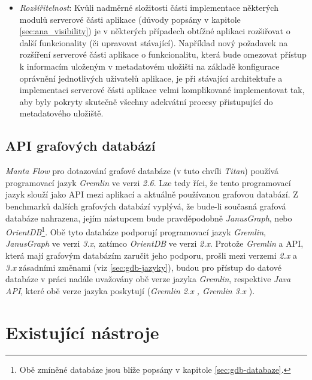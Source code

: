 \begin{itemize}
	\item{\textit{Rozšířitelnost}}: Kvůli nadměrné složitosti části implementace některých modulů serverové části aplikace (důvody popsány v kapitole \ref{sec:ana_visibility}) je v některých případech obtížné aplikaci rozšiřovat o další funkcionality (či upravovat stávající). Například nový požadavek na rozšíření serverové části aplikace o funkcionalitu, která bude omezovat přístup k informacím uloženým v metadatovém uložišti na základě konfigurace oprávnění jednotlivých uživatelů aplikace, je při stávající architektuře a implementaci serverové části aplikace velmi komplikované implementovat tak, aby byly pokryty skutečně všechny adekvátní procesy přistupující do metadatového uložiště.
\end{itemize}


\subsection{API grafových databází}
\label{sec:ana_gdbapi}
\textit{Manta Flow} pro dotazování grafové databáze (v tuto chvíli \textit{Titan}) používá programovací jazyk \textit{Gremlin} ve verzi \textit{2.6}. Lze tedy říci, že tento programovací jazyk slouží jako API mezi aplikací a aktuálně používanou grafovou databází. Z benchmarků dalších grafových databází \cite{Kovar18} vyplývá, že bude-li současná grafová databáze nahrazena, jejím nástupcem bude pravděpodobně \textit{JanusGraph}, nebo \textit{OrientDB}\footnote{Obě zmíněné databáze jsou blíže popsány v kapitole \ref{sec:gdb-databaze}.}. Obě tyto databáze podporují programovací jazyk \textit{Gremlin}, \textit{JanusGraph} ve verzi \textit{3.x}, zatímco \textit{OrientDB} ve verzi \textit{2.x}.
Protože \textit{Gremlin} a API, která mají grafovým databázím zaručit jeho podporu, prošli mezi verzemi \textit{2.x} a \textit{3.x} zásadními změnami (viz \ref{sec:gdb-jazyky}), budou pro přístup do datové databáze v práci nadále uvažovány obě verze jazyka \textit{Gremlin}, respektive \textit{Java API}, které obě verze jazyka poskytují (\textit{Gremlin 2.x \cite{Gremlin14}, Gremlin 3.x \cite{Gremlin17}}).

\section{Existující nástroje}
\label{sec:ana_state_of_art}


